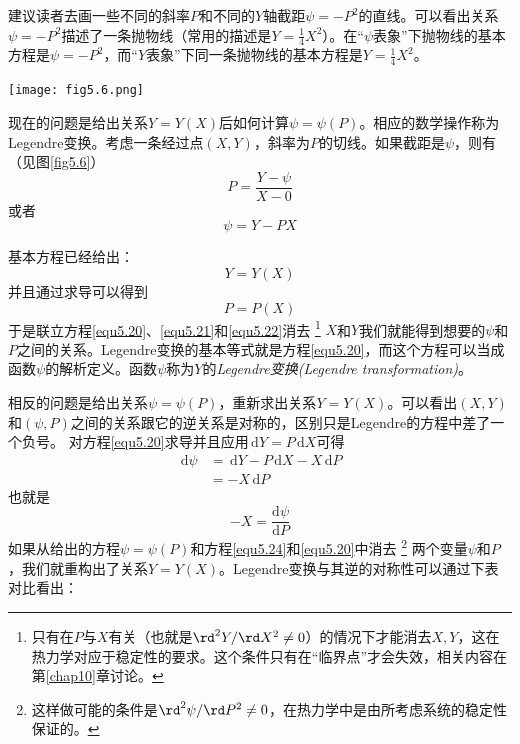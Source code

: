 建议读者去画一些不同的斜率$P$和不同的$Y$轴截距$\psi=-P^2$的直线。可以看出关系$\psi=-P^2$描述了一条抛物线（常用的描述是$Y=\frac{1}{4}X^2$）。在“$\psi$表象”下抛物线的基本方程是$\psi=-P^2$，而“$Y$表象”下同一条抛物线的基本方程是$Y=\frac{1}{4}X^2$。

{
	\centering
	\texttt{[image: fig5.6.png]}
	\figcaption{}
	\label{fig5.6}
}

现在的问题是给出关系$Y=Y(X)$后如何计算$\psi=\psi(P)$。相应的数学操作称为Legendre变换。考虑一条经过点$(X,Y)$，斜率为$P$的切线。如果截距是$\psi$，则有（见图\ref{fig5.6}）
\begin{equation}
\label{equ5.19}
	P=\frac{Y-\psi}{X-0}
\end{equation}
或者
\begin{equation}
\label{equ5.20}
	\psi=Y-PX
\end{equation}

基本方程已经给出：
\begin{equation}
\label{equ5.21}
	Y=Y(X)
\end{equation}
并且通过求导可以得到
\begin{equation}
\label{equ5.22}
	P=P(X)
\end{equation}
于是联立方程\eqref{equ5.20}、\eqref{equ5.21}和\eqref{equ5.22}消去%
\footnote{只有在$P$与$X$有关（也就是$\rd^2 Y / \rd X^2 \neq 0$）的情况下才能消去$X, Y$，这在热力学对应于稳定性的要求。这个条件只有在“临界点”才会失效，相关内容在第\ref{chap10}章讨论。}%
$X$和$Y$我们就能得到想要的$\psi$和$P$之间的关系。Legendre变换的基本等式就是方程\eqref{equ5.20}，而这个方程可以当成函数$\psi$的解析定义。函数$\psi$称为$Y$的{\it Legendre变换(Legendre transformation)}。

相反的问题是给出关系$\psi=\psi(P)$，重新求出关系$Y=Y(X)$。可以看出$(X,Y)$和$(\psi,P)$之间的关系跟它的逆关系是对称的，区别只是Legendre的方程中差了一个负号。
对方程\eqref{equ5.20}求导并且应用$\,\mathrm dY=P\,\mathrm dX$可得
\begin{align}
\label{equ5.23}
	\,\mathrm d\psi &= \,\mathrm dY-P\,\mathrm dX-X\,\mathrm dP \nonumber \\
	~ &= -X\,\mathrm dP
\end{align}
也就是
\begin{equation}
\label{equ5.24}
	-X=\frac{\mathrm d\psi}{\mathrm dP}
\end{equation}
如果从给出的方程$\psi=\psi(P)$和方程\eqref{equ5.24}和\eqref{equ5.20}中消去%
\footnote{这样做可能的条件是$\rd^2\psi/\rd P^2\neq0$，在热力学中是由所考虑系统的稳定性保证的。}%
两个变量$\psi$和$P$，我们就重构出了关系$Y=Y(X)$。Legendre变换与其逆的对称性可以通过下表对比看出：

